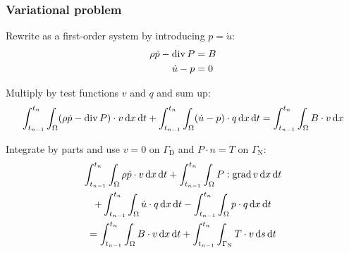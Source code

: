 \begin{frame}
  \frametitle{Variational problem}

  Rewrite as a first-order system by introducing $p = \dot{u}$:
  \begin{align*}
    \rho \dot{p} - \operatorname{\mathrm{div}} P &= B \\
    \dot{u} - p &= 0
  \end{align*}

  Multiply by test functions $v$ and $q$ and sum up:
  \begin{equation*}
    \int_{t_{n-1}}^{t_n} \int_{\Omega} (\rho \dot{p} - \operatorname{\mathrm{div}} P) \cdot v \, \mathrm{d}x \, \mathrm{d}t +
    \int_{t_{n-1}}^{t_n} \int_{\Omega} (\dot{u} - p) \cdot q \, \mathrm{d}x \, \mathrm{d}t
    = \int_{t_{n-1}}^{t_n} \int_{\Omega} B \cdot v \, \mathrm{d}x
  \end{equation*}

  Integrate by parts and use $v = 0$ on $\Gamma_{\mathrm{D}}$ and $P
  \cdot n = T$ on $\Gamma_{\mathrm{N}}$:
  \begin{multline*}
      \int_{t_{n-1}}^{t_n} \int_{\Omega} \rho \dot{p} \cdot v \, \mathrm{d}x \, \mathrm{d}t
      + \int_{t_{n-1}}^{t_n} \int_{\Omega} P : \operatorname{\mathrm{grad}} v \, \mathrm{d}x \, \mathrm{d}t \\
      + \int_{t_{n-1}}^{t_n} \int_{\Omega} \dot{u} \cdot q \, \mathrm{d}x \, \mathrm{d}t
      - \int_{t_{n-1}}^{t_n} \int_{\Omega} p \cdot q \, \mathrm{d}x \, \mathrm{d}t \\
      = \int_{t_{n-1}}^{t_n} \int_{\Omega} B \cdot v \, \mathrm{d}x \, \mathrm{d}t
      + \int_{t_{n-1}}^{t_n} \int_{\Gamma_{\mathrm{N}}} T \cdot v \, \mathrm{d}s \, \mathrm{d}t
  \end{multline*}

\end{frame}
